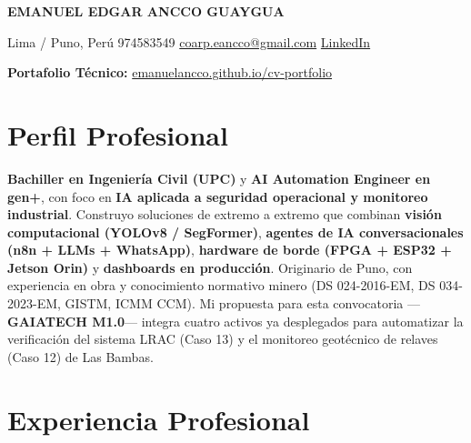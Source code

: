 \documentclass[10pt, a4paper]{article}
\begin{document}
\begin{center}
    {\Huge\bfseries EMANUEL EDGAR ANCCO GUAYGUA}
    \vspace{1.5mm}

    \faMapMarker*{} Lima / Puno, Perú \quad
    \faPhone*{} 974583549 \quad
    \faEnvelope{} \href{mailto:coarp.eancco@gmail.com}{coarp.eancco@gmail.com} \quad
    \faLinkedin{} \href{https://www.linkedin.com/in/emanuel-edgar-ancco-guaygua-a61210352}{LinkedIn}

    \faGlobe{} \textbf{Portafolio Técnico:} \href{https://emanuelancco.github.io/cv-portfolio/}{emanuelancco.github.io/cv-portfolio}
\end{center}

\section*{Perfil Profesional}
\textbf{Bachiller en Ingeniería Civil (UPC)} y \textbf{AI Automation Engineer en gen+}, con foco en \textbf{IA aplicada a seguridad operacional y monitoreo industrial}. Construyo soluciones de extremo a extremo que combinan \textbf{visión computacional (YOLOv8 / SegFormer)}, \textbf{agentes de IA conversacionales (n8n + LLMs + WhatsApp)}, \textbf{hardware de borde (FPGA + ESP32 + Jetson Orin)} y \textbf{dashboards en producción}. Originario de Puno, con experiencia en obra y conocimiento normativo minero (DS 024-2016-EM, DS 034-2023-EM, GISTM, ICMM CCM). Mi propuesta para esta convocatoria —\textbf{GAIATECH M1.0}— integra cuatro activos ya desplegados para automatizar la verificación del sistema LRAC (Caso 13) y el monitoreo geotécnico de relaves (Caso 12) de Las Bambas.

\vspace{1mm}
\begin{center}
\end{center}

\section*{Experiencia Profesional}
\end{document}
